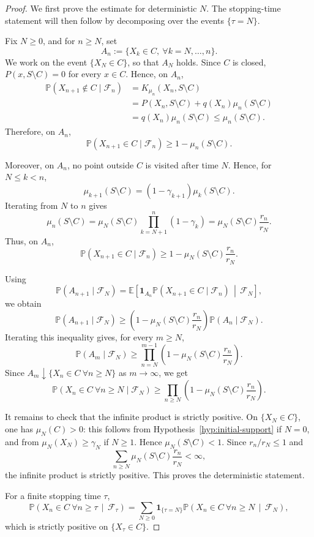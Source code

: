 \documentclass[10pt,letterpaper]{article}
\theoremstyle{compactplain}
\theoremstyle{compactdefinition}
\newcommand{\1}{\mathds{1}}
\begin{document}
\begin{proof}
We first prove the estimate for deterministic \(N\). The stopping-time statement will then follow by
decomposing over the events \(\{\tau=N\}\).

Fix \(N\geq0\), and for \(n\geq N\), set
\[
A_n:=\{X_k\in C,\ \forall k=N,\ldots,n\}.
\]
We work on the event \(\{X_N\in C\}\), so that \(A_N\) holds. Since \(C\) is
closed, \(P(x,S\setminus C)=0\) for every \(x\in C\). Hence, on \(A_n\),
\[
\begin{aligned}
\mathbb P(X_{n+1}\notin C\mid\mathcal F_n)
&=
K_{\mu_n}(X_n,S\setminus C)\\
&=
P(X_n,S\setminus C)+q(X_n)\mu_n(S\setminus C)\\
&=
q(X_n)\mu_n(S\setminus C)
\leq
\mu_n(S\setminus C).
\end{aligned}
\]
Therefore, on \(A_n\),
\[
\mathbb P(X_{n+1}\in C\mid\mathcal F_n)
\geq
1-\mu_n(S\setminus C).
\]

Moreover, on \(A_n\), no point outside \(C\) is visited after time \(N\). Hence,
for \(N\leq k<n\),
\[
\mu_{k+1}(S\setminus C)
=
(1-\gamma_{k+1})\mu_k(S\setminus C).
\]
Iterating from \(N\) to \(n\) gives
\[
\mu_n(S\setminus C)
=
\mu_N(S\setminus C)\prod_{k=N+1}^n(1-\gamma_k)
=
\mu_N(S\setminus C)\frac{r_n}{r_N}.
\]
Thus, on \(A_n\),
\[
\mathbb P(X_{n+1}\in C\mid\mathcal F_n)
\geq
1-\mu_N(S\setminus C)\frac{r_n}{r_N}.
\]

Using
\[
\mathbb P(A_{n+1}\mid\mathcal F_N)
=
\mathbb E\left[
\mathbf 1_{A_n}
\mathbb P(X_{n+1}\in C\mid\mathcal F_n)
\,\middle|\,
\mathcal F_N
\right],
\]
we obtain
\[
\mathbb P(A_{n+1}\mid\mathcal F_N)
\geq
\left(
1-\mu_N(S\setminus C)\frac{r_n}{r_N}
\right)
\mathbb P(A_n\mid\mathcal F_N).
\]
Iterating this inequality gives, for every \(m\geq N\),
\[
\mathbb P(A_m\mid\mathcal F_N)
\geq
\prod_{n=N}^{m-1}
\left(
1-\mu_N(S\setminus C)\frac{r_n}{r_N}
\right).
\]
Since \(A_m\downarrow\{X_n\in C\ \forall n\geq N\}\) as \(m\to\infty\), we get
\[
\mathbb P(X_n\in C\ \forall n\geq N\mid\mathcal F_N)
\geq
\prod_{n\geq N}
\left(
1-\mu_N(S\setminus C)\frac{r_n}{r_N}
\right).
\]

It remains to check that the infinite product is strictly positive. On \(\{X_N\in C\}\), one has \(\mu_N(C)>0\): this follows from
Hypothesis~\ref{hyp:initial-support} if \(N=0\), and from
\(\mu_N(X_N)\geq\gamma_N\) if \(N\geq1\). Hence
\(\mu_N(S\setminus C)<1\). Since \(r_n/r_N\leq1\) and
\[
\sum_{n\geq N}
\mu_N(S\setminus C)\frac{r_n}{r_N}<\infty,
\]
the infinite product is strictly positive. This proves the deterministic statement.


For a finite stopping time \(\tau\),
\[
\mathbb P\left(
X_n\in C\ \forall n\geq\tau
\,\middle|\,
\mathcal F_\tau
\right)
=
\sum_{N\geq0}
\mathbf1_{\{\tau=N\}}
\mathbb P\left(
X_n\in C\ \forall n\geq N
\,\middle|\,
\mathcal F_N
\right),
\]
which is strictly positive on \(\{X_\tau\in C\}\).

\end{proof}
\end{document}
